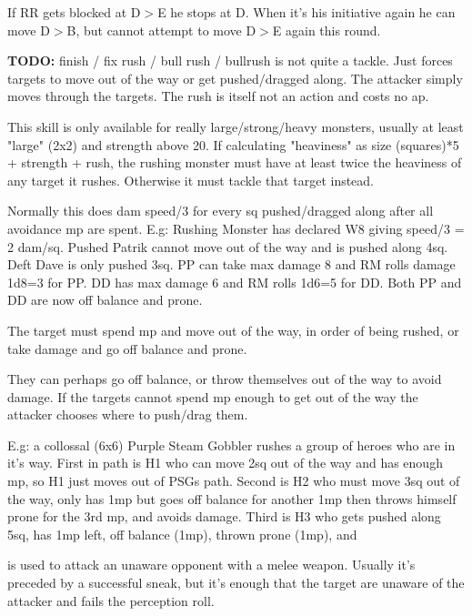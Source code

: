 If RR gets blocked at D$>$E he stops at D. When it's his initiative again he can move D$>$B, but cannot attempt to move D$>$E again this round.


\textbf{TODO:} finish / fix rush / bull rush / bullrush
 is not quite a tackle. Just forces targets to move out of the way or get pushed/dragged along. The attacker simply moves through the targets. The rush is itself not an action and costs no ap. 

This skill is only available for really large/strong/heavy monsters, usually at least "large" (2x2) and strength above 20. If calculating "heaviness" as size (squares)*5 + strength + rush, the rushing monster must have at least twice the heaviness of any target it rushes. Otherwise it must tackle that target instead.

Normally this does dam speed/3 for every sq pushed/dragged along after all avoidance mp are spent. E.g: Rushing Monster has declared W8 giving speed/3 = 2 dam/sq. Pushed Patrik cannot move out of the way and is pushed along 4sq. Deft Dave is only pushed 3sq. PP can take max damage 8 and RM rolls damage 1d8=3 for PP. DD has max damage 6 and RM rolls 1d6=5 for DD. Both PP and DD are now off balance and prone.


The target must spend mp and move out of the way, in order of being rushed, or take damage and go off balance and prone.

 They can perhaps go off balance, or throw themselves out of the way to avoid damage.
If the targets cannot spend mp enough to get out of the way the attacker chooses where to push/drag them.

E.g: a collossal (6x6) Purple Steam Gobbler rushes a group of heroes who are in it's way. First in path is H1 who can move 2sq out of the way and has enough mp, so H1 just moves out of PSGs path. Second is H2 who must move 3sq out of the way, only has 1mp but goes off balance for another 1mp then throws himself prone for the 3rd mp, and avoids damage. Third is H3 who gets pushed along 5sq, has 1mp left, off balance (1mp), thrown prone (1mp), and


 is used to attack an unaware opponent with a melee weapon. Usually it's preceded by a successful sneak, but it's enough that the target are unaware of the attacker and fails the perception roll.

